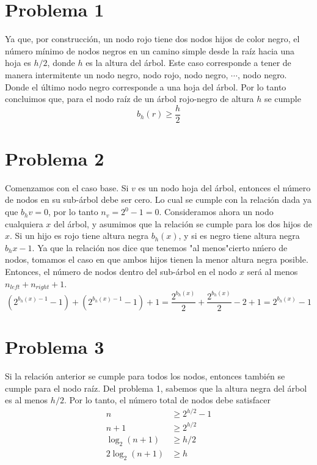 \documentclass[10pt,a4paper]{article}
\begin{document}
\section*{Problema 1}
Ya que, por construcci\'on, un nodo rojo tiene dos nodos hijos de color negro, el n\'umero m\'inimo de nodos negros en un camino simple desde la ra\'iz hacia una hoja es $h/2$, donde $h$ es la altura del \'arbol. Este caso corresponde a tener de manera intermitente un nodo negro, nodo rojo, nodo negro, $\cdots$, nodo negro. Donde el \'ultimo nodo negro corresponde a una hoja del \'arbol. Por lo tanto concluimos que, para el nodo ra\'iz de un \'arbol rojo-negro de altura $h$ se cumple
\begin{equation}
    b_h(r) \geq \frac{h}{2}
\end{equation}

\section*{Problema 2}
Comenzamos con el caso base. Si $v$ es un nodo hoja del \'arbol, entonces el n\'umero de nodos en su sub-\'arbol debe ser cero. Lo cual se cumple con la relaci\'on dada ya que $b_h{v}=0$, por lo tanto $n_v=2^{0}-1=0$. Consideramos ahora un nodo cualquiera $x$ del \'arbol, y asumimos que la relaci\'on se cumple para los dos hijos de $x$. Si un hijo es rojo tiene altura negra $b_h(x)$, y si es negro tiene altura negra $b_h{x}-1$. Ya que la relaci\'on nos dice que tenemos "al menos"\space cierto n\'mero de nodos, tomamos el caso en que ambos hijos tienen la menor altura negra posible. Entonces, el n\'umero de nodos dentro del sub-\'arbol en el nodo $x$ ser\'a al menos $n_{left}+n_{right}+1$.
\begin{equation}
(2^{b_h(x)-1}-1)+(2^{b_h(x)-1}-1)+1= \frac{2^{b_h(x)}}{2}+\frac{2^{b_h(x)}}{2}-2+1=2^{b_h(x)}-1
\end{equation}

\section*{Problema 3}
Si la relaci\'on anterior se cumple para todos los nodos, entonces tambi\'en se cumple para el nodo ra\'iz. Del problema 1, sabemos que la altura negra del \'arbol es al menos $h/2$. Por lo tanto, el n\'umero total de nodos debe satisfacer
\begin{align*}
    n&\geq 2^{h/2}-1\\
    n+1&\geq 2^{h/2}\\
    \log_2(n+1)&\geq h/2\\
 2\log_2(n+1) &\geq h
\end{align*}
\end{document}
